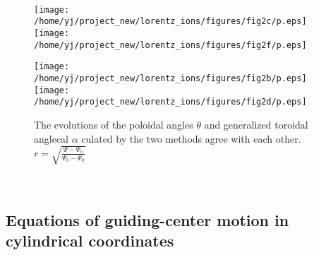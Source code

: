 \documentclass{article}
\begin{document}
\

\

\begin{figure}[h]
  \
  
  \texttt{[image: /home/yj/project\_new/lorentz\_ions/figures/fig2c/p.eps]}\texttt{[image: /home/yj/project\_new/lorentz\_ions/figures/fig2f/p.eps]}
  
  \texttt{[image: /home/yj/project\_new/lorentz\_ions/figures/fig2b/p.eps]}\texttt{[image: /home/yj/project\_new/lorentz\_ions/figures/fig2d/p.eps]}
  \caption{The evolutions of the poloidal angles $\theta$ and generalized
  toroidal anglecal $\alpha$ culated by the two methods agree with each
  other.\quad$r = \sqrt{\frac{\Psi - \Psi_0}{\Psi_b - \Psi_0}}$}
\end{figure}

\

\subsection{Equations of guiding-center motion in cylindrical coordinates}
\end{document}
